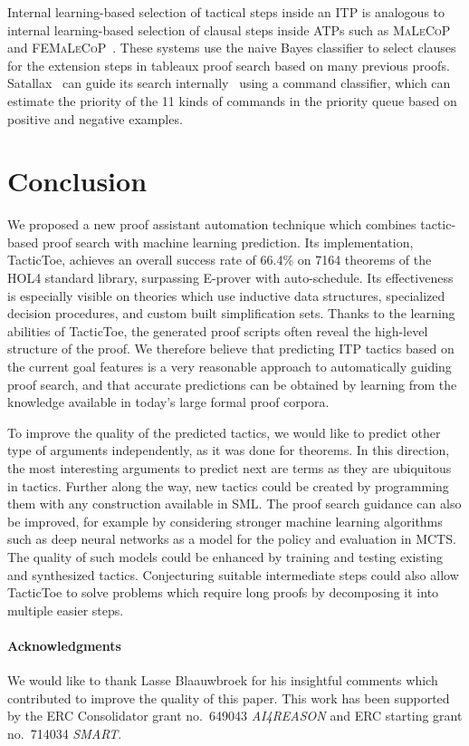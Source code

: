 \documentclass[runningheads,a4paper,draft]{svjour3}
\def\holfour{\textsf{HOL4}\xspace}
\def\eprover{\textsf{E-prover}\xspace}
\def\sml{\textsf{SML}\xspace}
\def\tactictoe{\textsf{TacticToe}\xspace}
\begin{document}
Internal learning-based selection of tactical steps inside an ITP is analogous
to internal learning-based selection of clausal steps inside ATPs such as
\textsc{MaLeCoP}~\cite{malecop} and \textsc{FEMaLeCoP}~\cite{femalecop}. These
systems
use the naive Bayes classifier to  select clauses for the extension steps in
tableaux proof search based on many previous proofs. Satallax~\cite{Brown2012a}
can guide its
search internally~\cite{mllax} using a command classifier, which can estimate
the priority of the 11 kinds of
commands in the priority queue based on positive and negative examples.

\section{Conclusion}\label{sec:concl}
We proposed a new proof assistant automation technique which combines
tactic-based proof search with machine learning prediction.
Its implementation, \tactictoe, achieves an overall success rate of 66.4\%
on 7164 theorems of the \holfour standard library, surpassing \eprover
with auto-schedule. Its
effectiveness is especially visible on
theories which use inductive data structures, specialized decision procedures,
and custom built simplification sets.
Thanks to the learning abilities of \tactictoe, the generated proof scripts
often reveal the high-level structure of the proof. %
We therefore believe that predicting ITP tactics based on the current goal
features is a very reasonable approach to automatically guiding proof search,
and that accurate predictions can be obtained by learning from the knowledge
available in today's large formal proof corpora.

To improve the quality of the predicted tactics,
we would like to predict other type of arguments independently, as it was done
for theorems. In this direction, the most interesting arguments to
predict next are terms as they are ubiquitous in tactics. Further along the way,
new tactics could be created by programming them with any construction
available in \sml.
The proof search guidance can also be improved, for example by considering
stronger machine learning algorithms
such as deep neural networks as a model for the policy and evaluation in MCTS.
The quality of such models could be enhanced by
training and testing existing and synthesized tactics.
Conjecturing suitable intermediate steps could also allow \tactictoe to solve
problems which require long proofs by decomposing it into multiple easier
steps.

\paragraph{Acknowledgments}\label{sect:acks}
We would like to thank Lasse Blaauwbroek for his insightful comments which
contributed to improve the quality of this paper. This work has been supported
by the ERC Consolidator grant no.\ 649043 \textit{AI4REASON} and ERC starting
grant no.\ 714034 \textit{SMART}.



\end{document}
